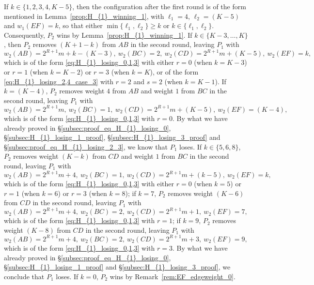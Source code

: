 \documentclass[11pt,reqno]{amsart}
\theoremstyle{definition}
\theoremstyle{definition}
\begin{document}
\begin{enumerate}
If $k \in \{1,2,3,4,K-5\}$, then the configuration after the first round is of the form mentioned in Lemma~\ref{prop:H_{1}_winning_1}, with $\ell_{1}=4$, $\ell_{2}=(K-5)$ and $w_{1}(EF)=k$, so that either $\min\{\ell_{1},\ell_{2}\}\geqslant k$ or $k \in \{\ell_{1},\ell_{2}\}$. Consequently, $P_{2}$ wins by Lemma~\ref{prop:H_{1}_winning_1}. If $k\in \{K-3,\ldots,K\}$, then $P_{2}$ removes $(K+1-k)$ from $AB$ in the second round, leaving $P_{1}$ with
\begin{equation}
w_{2}(AB)=2^{R+1}m+k-(K-3),\ w_{2}(BC)=2,\ w_{2}(CD)=2^{R+1}m+(K-5),\ w_{2}(EF)=k,\nonumber
\end{equation}
which is of the form \eqref{eq:H_{1}_losing_0,1,3} with either $r=0$ (when $k=K-3$) or $r=1$ (when $k=K-2$) or $r=3$ (when $k=K$), or of the form \eqref{eq:H_{1}_losing_2,4_case_3} with $r=2$ and $s=2$ (when $k=K-1$). If $k=(K-4)$, $P_{2}$ removes weight $4$ from $AB$ and weight $1$ from $BC$ in the second round, leaving $P_{1}$ with
\begin{equation}
w_{2}(AB)=2^{R+1}m,\ w_{2}(BC)=1,\ w_{2}(CD)=2^{R+1}m+(K-5),\ w_{2}(EF)=(K-4),\nonumber
\end{equation}
which is of the form \eqref{eq:H_{1}_losing_0,1,3} with $r=0$. By what we have already proved in \S\ref{subsec:proof_eq_H_{1}_losing_0}, \S\ref{subsec:H_{1}_losing_1_proof}, \S\ref{subsec:H_{1}_losing_3_proof} and \S\ref{subsec:proof_eq_H_{1}_losing_2_3}, we know that $P_{1}$ loses. If $k\in\{5,6,8\}$, $P_{2}$ removes weight $(K-k)$ from $CD$ and weight $1$ from $BC$ in the second round, leaving $P_{1}$ with
\begin{equation}
w_{2}(AB)=2^{R+1}m+4,\ w_{2}(BC)=1,\ w_{2}(CD)=2^{R+1}m+(k-5),\ w_{2}(EF)=k,\nonumber
\end{equation}
which is of the form \eqref{eq:H_{1}_losing_0,1,3} with either $r=0$ (when $k=5$) or $r=1$ (when $k=6$) or $r=3$ (when $k=8$); if $k=7$, $P_{2}$ removes weight $(K-6)$ from $CD$ in the second round, leaving $P_{1}$ with
\begin{equation}
w_{2}(AB)=2^{R+1}m+4,\ w_{2}(BC)=2,\ w_{2}(CD)=2^{R+1}m+1,\ w_{2}(EF)=7,\nonumber
\end{equation}
which is of the form \eqref{eq:H_{1}_losing_0,1,3} with $r=1$; if $k=9$, $P_{2}$ removes weight $(K-8)$ from $CD$ in the second round, leaving $P_{1}$ with
\begin{equation}
w_{2}(AB)=2^{R+1}m+4,\ w_{2}(BC)=2,\ w_{2}(CD)=2^{R+1}m+3,\ w_{2}(EF)=9,\nonumber
\end{equation}
which is of the form \eqref{eq:H_{1}_losing_0,1,3} with $r=3$. By what we have already proved in \S\ref{subsec:proof_eq_H_{1}_losing_0}, \S\ref{subsec:H_{1}_losing_1_proof} and \S\ref{subsec:H_{1}_losing_3_proof}, we conclude that $P_{1}$ loses. If $k=0$, $P_{2}$ wins by Remark~\ref{rem:EF_edgeweight_0}.


\end{enumerate}
\end{document}
